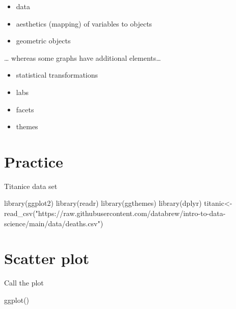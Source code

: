 \documentclass[
]{book}
\newenvironment{Shaded}{\begin{snugshade}}{\end{snugshade}}
\newcommand{\FunctionTok}[1]{\textcolor[rgb]{0.00,0.00,0.00}{#1}}
\newcommand{\NormalTok}[1]{#1}
\newcommand{\OtherTok}[1]{\textcolor[rgb]{0.56,0.35,0.01}{#1}}
\newcommand{\StringTok}[1]{\textcolor[rgb]{0.31,0.60,0.02}{#1}}
\providecommand{\tightlist}{%
  \setlength{\itemsep}{0pt}\setlength{\parskip}{0pt}}
\begin{document}
\begin{itemize}
\tightlist
\item
  data
\item
  aesthetics (mapping) of variables to objects
\item
  geometric objects
\end{itemize}

\ldots{} whereas some graphs have additional elements\ldots{}

\begin{itemize}
\tightlist
\item
  statistical transformations
\item
  labs
\item
  facets
\item
  themes
\end{itemize}

\hypertarget{practice}{%
\section*{Practice}\label{practice}}

Titanice data set

\begin{Shaded}
\begin{Highlighting}[]
\FunctionTok{library}\NormalTok{(ggplot2)}
\FunctionTok{library}\NormalTok{(readr)}
\FunctionTok{library}\NormalTok{(ggthemes)}
\FunctionTok{library}\NormalTok{(dplyr)}
\NormalTok{titanic}\OtherTok{\textless{}{-}} \FunctionTok{read\_csv}\NormalTok{(}\StringTok{"https://raw.githubusercontent.com/databrew/intro{-}to{-}data{-}science/main/data/deaths.csv"}\NormalTok{)}
\end{Highlighting}
\end{Shaded}

\hypertarget{scatter-plot}{%
\section*{Scatter plot}\label{scatter-plot}}

Call the plot

\begin{Shaded}
\begin{Highlighting}[]
\FunctionTok{ggplot}\NormalTok{()}
\end{Highlighting}
\end{Shaded}
\end{document}
